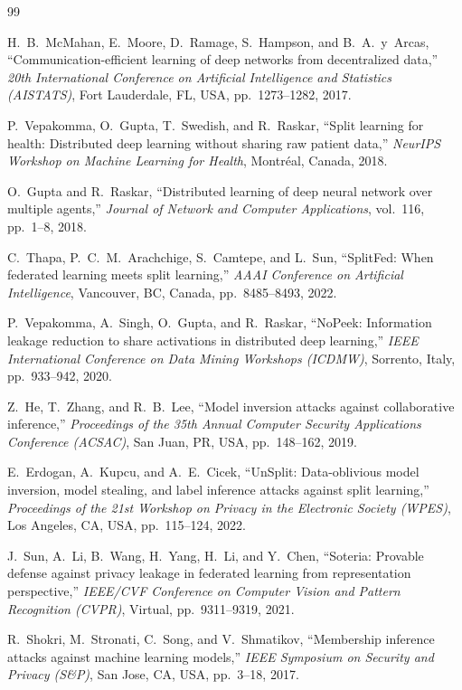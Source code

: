 \documentclass[11pt,a4paper,oneside]{report}
\begin{document}
\begin{thebibliography}{99}

H.~B.~McMahan, E.~Moore, D.~Ramage, S.~Hampson, and B.~A.~y~Arcas,
``Communication-efficient learning of deep networks from decentralized
data,'' \emph{20th International Conference on Artificial Intelligence
and Statistics (AISTATS)}, Fort Lauderdale, FL, USA, pp.~1273--1282,
2017.

P.~Vepakomma, O.~Gupta, T.~Swedish, and R.~Raskar, ``Split learning
for health: Distributed deep learning without sharing raw patient
data,'' \emph{NeurIPS Workshop on Machine Learning for Health},
Montr\'eal, Canada, 2018.

O.~Gupta and R.~Raskar, ``Distributed learning of deep neural network
over multiple agents,'' \emph{Journal of Network and Computer
Applications}, vol.~116, pp.~1--8, 2018.

C.~Thapa, P.~C.~M.~Arachchige, S.~Camtepe, and L.~Sun, ``SplitFed:
When federated learning meets split learning,'' \emph{AAAI Conference
on Artificial Intelligence}, Vancouver, BC, Canada, pp.~8485--8493,
2022.

P.~Vepakomma, A.~Singh, O.~Gupta, and R.~Raskar, ``NoPeek: Information
leakage reduction to share activations in distributed deep learning,''
\emph{IEEE International Conference on Data Mining Workshops
(ICDMW)}, Sorrento, Italy, pp.~933--942, 2020.

Z.~He, T.~Zhang, and R.~B.~Lee, ``Model inversion attacks against
collaborative inference,'' \emph{Proceedings of the 35th Annual
Computer Security Applications Conference (ACSAC)}, San Juan, PR,
USA, pp.~148--162, 2019.

E.~Erdogan, A.~Kupcu, and A.~E.~Cicek, ``UnSplit: Data-oblivious
model inversion, model stealing, and label inference attacks against
split learning,'' \emph{Proceedings of the 21st Workshop on Privacy
in the Electronic Society (WPES)}, Los Angeles, CA, USA,
pp.~115--124, 2022.

J.~Sun, A.~Li, B.~Wang, H.~Yang, H.~Li, and Y.~Chen, ``Soteria:
Provable defense against privacy leakage in federated learning from
representation perspective,'' \emph{IEEE/CVF Conference on Computer
Vision and Pattern Recognition (CVPR)}, Virtual, pp.~9311--9319,
2021.

R.~Shokri, M.~Stronati, C.~Song, and V.~Shmatikov, ``Membership
inference attacks against machine learning models,'' \emph{IEEE
Symposium on Security and Privacy (S\&P)}, San Jose, CA, USA,
pp.~3--18, 2017.


\end{thebibliography}
\end{document}
